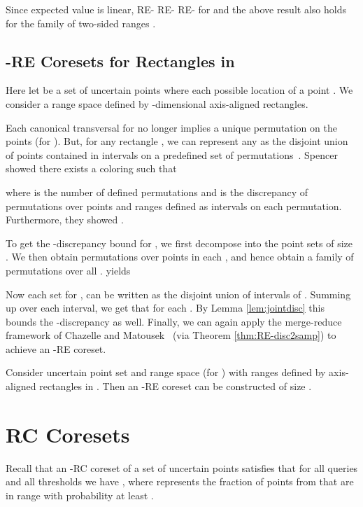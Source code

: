 \documentclass[11pt]{myclass}
\newcommand{\RC}{\textsf{RC}\xspace}
\newcommand{\RE}{\textsf{RE}\xspace}
\begin{document}
Since expected value is linear, \RE- \RE- \RE- for  and the above result also holds for the family of two-sided ranges .  



\subsection{-\RE Coresets for Rectangles in }
\label{subsec:highdre}
Here let  be a set of  uncertain points where each possible location of a point .  We consider a range space  defined by -dimensional axis-aligned rectangles.  

Each canonical transversal  for  no longer implies a unique permutation on the points (for ).  But, for any rectangle , we can represent any   as the disjoint union of points  contained in intervals on a predefined set of  permutations~\cite{bohus}. 
Spencer \etal~\cite{spencer} showed there exists a coloring  such that 
 
where  is the number of defined permutations and  is the discrepancy of  permutations over  points and ranges defined as intervals on each permutation.  Furthermore, they showed .  


To get the -discrepancy bound for , we first decompose  into the  point sets  of size .
We then obtain  permutations over points in each , and hence obtain a family  of  permutations over all .  yields 

Now each set  for , can be written as the disjoint union of  intervals of .  Summing up over each interval, we get that 
 for each .  
By Lemma \ref{lem:jointdisc} this bounds the -discrepancy as well.
Finally, we can again apply the merge-reduce framework of Chazelle and Matousek~\cite{CM96} (via Theorem \ref{thm:RE-disc2samp}) to achieve an -\RE coreset.  


\begin{theorem}\label{thm:highdeps-RE}
Consider uncertain point set  and range space  (for ) with ranges defined by axis-aligned rectangles in . 
Then an -\RE coreset can be constructed of size .
 \end{theorem}



\section{\RC Coresets}
\label{sec:RC}

Recall that an -\RC coreset  of a set  of  uncertain points satisfies that for all queries  and all thresholds  we have , where  represents the fraction of points from  that are in range  with probability at least .  
\end{document}
